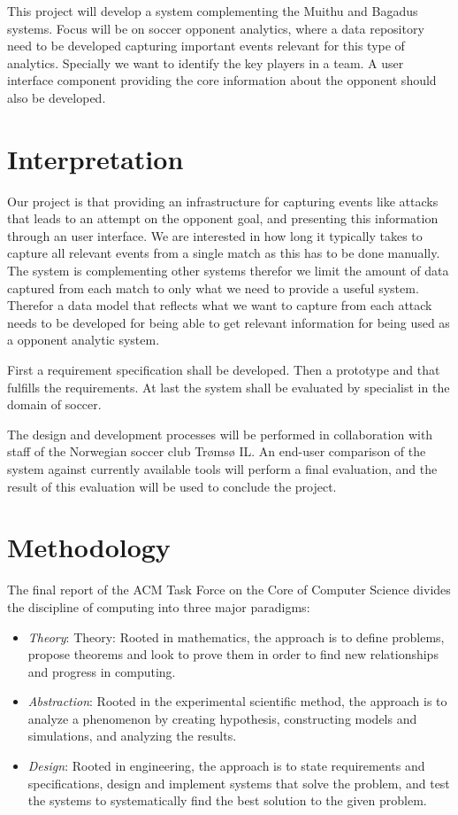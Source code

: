 This project will develop a system complementing the Muithu and Bagadus systems. Focus will be on soccer opponent analytics, where a data repository need to be developed capturing important events relevant for this type of analytics. Specially we want to identify the key players in a team. A user interface component providing the core information about the opponent should also be developed.

\section{Interpretation}

Our project is that providing an infrastructure for capturing events like attacks that leads to an attempt on the opponent goal, and presenting this information through an user interface. We are interested in how long it typically takes to capture all relevant events from a single match as this has to be done manually. The system is complementing other systems therefor we limit the amount of data captured from each match to only what we need to provide a useful system. Therefor a data model that reflects what we want to capture from each attack needs to be developed for being able to get relevant information for being used as a opponent analytic system.

First a requirement specification shall be developed. Then a prototype and that fulfills the requirements. At last the system shall be evaluated by  specialist in the domain of soccer.

The design and development processes will be performed in collaboration with staff of the Norwegian soccer club Trømsø IL. An end-user comparison of the system against currently available tools will perform a final evaluation, and the result of this evaluation will be used to conclude the project.

\section{Methodology}

The final report of the ACM Task Force on the Core of Computer Science \cite{computing_as_a_discipline} divides the discipline of computing into three major paradigms:

\begin{itemize}
\item \emph{Theory}: 
Theory: Rooted in mathematics, the approach is to define problems, propose theorems and look to prove them in order to find new relationships and progress in computing.
  
\item \emph{Abstraction}: 
Rooted in the experimental scientific method, the approach is to analyze a phenomenon by creating hypothesis, constructing models and simulations, and analyzing the results.
  
\item \emph{Design}: 
Rooted in engineering, the approach is to state requirements and specifications, design and implement systems that solve the problem, and test the systems to systematically find the best solution to the given problem.

\end{itemize}

